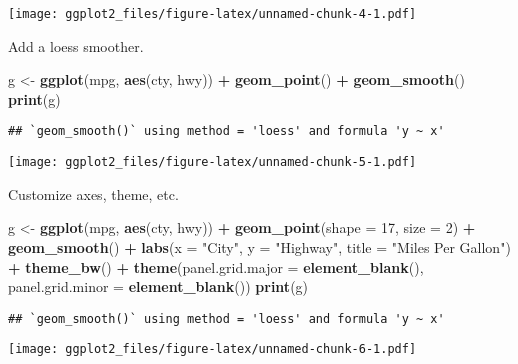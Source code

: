 \documentclass[]{article}
\newenvironment{Shaded}{\begin{snugshade}}{\end{snugshade}}
\newcommand{\KeywordTok}[1]{\textcolor[rgb]{0.13,0.29,0.53}{\textbf{#1}}}
\newcommand{\DataTypeTok}[1]{\textcolor[rgb]{0.13,0.29,0.53}{#1}}
\newcommand{\DecValTok}[1]{\textcolor[rgb]{0.00,0.00,0.81}{#1}}
\newcommand{\StringTok}[1]{\textcolor[rgb]{0.31,0.60,0.02}{#1}}
\newcommand{\OperatorTok}[1]{\textcolor[rgb]{0.81,0.36,0.00}{\textbf{#1}}}
\newcommand{\NormalTok}[1]{#1}
\begin{document}
\texttt{[image: ggplot2\_files/figure-latex/unnamed-chunk-4-1.pdf]}

Add a loess smoother.

\begin{Shaded}
\begin{Highlighting}[]
\NormalTok{g <-}\StringTok{ }\KeywordTok{ggplot}\NormalTok{(mpg, }\KeywordTok{aes}\NormalTok{(cty, hwy)) }\OperatorTok{+}
\StringTok{    }\KeywordTok{geom_point}\NormalTok{() }\OperatorTok{+}
\StringTok{    }\KeywordTok{geom_smooth}\NormalTok{()}
\KeywordTok{print}\NormalTok{(g)}
\end{Highlighting}
\end{Shaded}

\begin{verbatim}
## `geom_smooth()` using method = 'loess' and formula 'y ~ x'
\end{verbatim}

\texttt{[image: ggplot2\_files/figure-latex/unnamed-chunk-5-1.pdf]}

Customize axes, theme, etc.

\begin{Shaded}
\begin{Highlighting}[]
\NormalTok{g <-}\StringTok{ }\KeywordTok{ggplot}\NormalTok{(mpg, }\KeywordTok{aes}\NormalTok{(cty, hwy)) }\OperatorTok{+}
\StringTok{    }\KeywordTok{geom_point}\NormalTok{(}\DataTypeTok{shape =} \DecValTok{17}\NormalTok{, }\DataTypeTok{size =} \DecValTok{2}\NormalTok{) }\OperatorTok{+}
\StringTok{    }\KeywordTok{geom_smooth}\NormalTok{() }\OperatorTok{+}
\StringTok{    }\KeywordTok{labs}\NormalTok{(}\DataTypeTok{x =} \StringTok{"City"}\NormalTok{, }\DataTypeTok{y =} \StringTok{"Highway"}\NormalTok{, }\DataTypeTok{title =} \StringTok{"Miles Per Gallon"}\NormalTok{) }\OperatorTok{+}
\StringTok{    }\KeywordTok{theme_bw}\NormalTok{() }\OperatorTok{+}
\StringTok{    }\KeywordTok{theme}\NormalTok{(}\DataTypeTok{panel.grid.major =} \KeywordTok{element_blank}\NormalTok{(),}
          \DataTypeTok{panel.grid.minor =} \KeywordTok{element_blank}\NormalTok{())}
\KeywordTok{print}\NormalTok{(g)}
\end{Highlighting}
\end{Shaded}

\begin{verbatim}
## `geom_smooth()` using method = 'loess' and formula 'y ~ x'
\end{verbatim}

\texttt{[image: ggplot2\_files/figure-latex/unnamed-chunk-6-1.pdf]}
\end{document}
